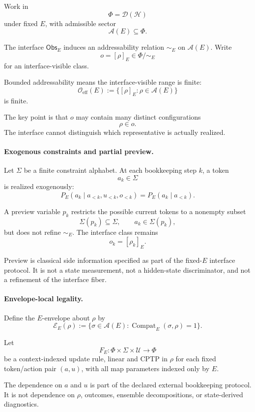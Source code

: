 \documentclass[aps,prx,onecolumn,11pt]{revtex4-2}
\theoremstyle{plain}
\theoremstyle{definition}
\theoremstyle{remark}
\newcommand{\Compat}{\operatorname{Compat}} %
\begin{document}
Work in
\[
\Phi=\mathcal D(\mathcal H)
\]
under fixed \(E\), with admissible sector
\[
\mathcal A(E)\subseteq\Phi.
\]

The interface \(\mathsf{Obs}_E\) induces an addressability relation
\(\sim_E\) on \(\mathcal A(E)\). Write
\[
o=[\rho]_E\in\Phi/{\sim_E}
\]
for an interface-visible class.

Bounded addressability means the interface-visible range is finite:
\[
\mathcal O_{\mathrm{eff}}(E)
:=
\{[\rho]_E:\rho\in\mathcal A(E)\}
\]
is finite.

The key point is that \(o\) may contain many distinct configurations
\[
\rho\in o.
\]
The interface cannot distinguish which representative is actually
realized.

\paragraph{Exogenous constraints and partial preview.}

Let \(\Sigma\) be a finite constraint alphabet. At each bookkeeping step
\(k\), a token
\[
a_k\in\Sigma
\]
is realized exogenously:
\begin{equation}
P_E(a_k\mid a_{<k},u_{<k},o_{<k})
=
P_E(a_k\mid a_{<k}).
\label{eq:toy_exogenous_arrivals_preview}
\end{equation}

A preview variable \(p_k\) restricts the possible current tokens to a
nonempty subset
\[
\Sigma(p_k)\subseteq\Sigma,
\qquad
a_k\in\Sigma(p_k),
\]
but does not refine \(\sim_E\). The interface class remains
\[
o_k=[\rho_k]_E.
\]

Preview is classical side information specified as part of the
fixed-\(E\) interface protocol. It is not a state measurement, not a
hidden-state discriminator, and not a refinement of the interface fiber.

\paragraph{Envelope-local legality.}

Define the \(E\)-envelope about \(\rho\) by
\[
\mathcal E_E(\rho)
:=
\{\sigma\in\mathcal A(E):\Compat_E(\sigma,\rho)=1\}.
\]

Let
\[
F_E:\Phi\times\Sigma\times\mathcal U\to\Phi
\]
be a context-indexed update rule, linear and CPTP in \(\rho\) for each
fixed token/action pair \((a,u)\), with all map parameters indexed only
by \(E\).

The dependence on \(a\) and \(u\) is part of the declared external
bookkeeping protocol. It is not dependence on \(\rho\), outcomes,
ensemble decompositions, or state-derived diagnostics.
\end{document}
